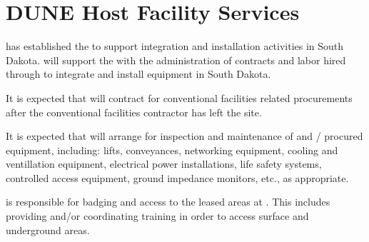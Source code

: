 \section{DUNE Host Facility Services}
\label{sec:fdsp-coord-host_facility_services}


\fnal has established the  to support integration and
installation activities in South Dakota.  will support the
 with the administration of contracts and labor hired
through \fnal to integrate and install equipment in South Dakota.

It is expected that  will contract for conventional
facilities related procurements after the  conventional facilities
contractor has left the site.

It is expected that  will arrange for inspection and maintenance of
 and / procured equipment, including:
lifts, conveyances, networking equipment, cooling and ventillation
equipment, electrical power installations, life safety systems,
controlled access equipment, ground impedance monitors, etc., as appropriate.

 is responsible for badging and access to the leased areas at . This
includes providing and/or coordinating  training in order to access surface and
underground areas. 

